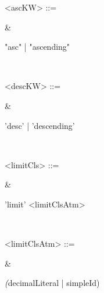 {    \noindent\parbox[t]{0.3\linewidth}{<ascKW> ::=} 
    & \noindent\parbox[t]{0.6\linewidth}{
        "asc" | "ascending"
    } \\


    \noindent\parbox[t]{0.3\linewidth}{<descKW> ::=} 
    & \noindent\parbox[t]{0.6\linewidth}{
        'desc' | 'descending'
    } \\


    \noindent\parbox[t]{0.3\linewidth}{<limitCls> ::=} 
    & \noindent\parbox[t]{0.6\linewidth}{
        'limit' <limitClsAtm> 
    } \\


    \noindent\parbox[t]{0.3\linewidth}{<limitClsAtm> ::=} 
    & \noindent\parbox[t]{0.6\linewidth}{
        \emph(decimalLiteral | simpleId)
    } \\

}
\newcommand{\naturalFunctionTable} {
    \noindent
    \begin{tabularx}{\linewidth}{l l}
        \hline
        \naturalFunction
        \hline
    \end{tabularx} 
}
